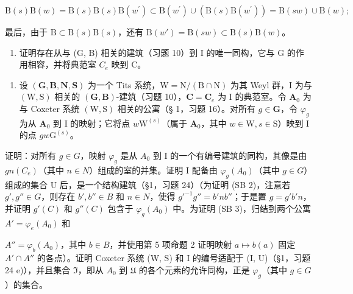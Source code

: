 \[
\mathrm{B} (s) \mathrm{B} (w) = \mathrm{B} (s) \mathrm{B} (s) \mathrm{B} \left(w ^ {\prime}\right) \subset \mathrm{B} \left(w ^ {\prime}\right) \cup \left(\mathrm{B} (s) \mathrm{B} \left(w ^ {\prime}\right)\right) = \mathrm{B} (s w) \cup \mathrm{B} (w);
\]

最后，由于 \(\mathrm{B} \subset \mathrm{B}(s)\mathrm{B}(s)\)，还有 \(\mathrm{B}(w') = \mathrm{B}(sw) \subset \mathrm{B}(s)\mathrm{B}(w)\)。

\begin{enumerate}
\def\labelenumi{\alph{enumi})}
\setcounter{enumi}{4}
\tightlist
\item
  证明存在从与 (G, B) 相关的建筑（习题 10）到 I 的唯一同构，它与 G 的作用相容，并将典范室 \(C_{e}\) 映到 C。
\end{enumerate}

\begin{enumerate}
\def\labelenumi{\arabic{enumi})}
\setcounter{enumi}{11}
\tightlist
\item
  设 \((\mathbf{G},\mathbf{B},\mathbf{N},\mathbf{S})\) 为一个 Tits 系统，\(\mathrm{W} = \mathrm{N} / (\mathrm{B}\cap \mathrm{N})\) 为其 Weyl 群，I 为与 \((\mathrm{W},\mathrm{S})\) 相关的 \((\mathbf{G},\mathbf{B})\)-建筑（习题 10），\(\mathbf{C} = \mathbf{C}_e\) 为 I 的典范室。令 \(\mathbf{A}_0\) 为与 Coxeter 系统 \((\mathrm{W},\mathrm{S})\) 相关的公寓（§ 1，习题 16）。对所有 \(g\in \mathbf{G}\)，令 \(\varphi_g\) 为从 \(\mathbf{A}_0\) 到 I 的映射；它将点 \(w\mathrm{W}^{(s)}\)（属于 \(\mathbf{A}_0\)，其中 \(w\in \mathrm{W}, s\in \mathrm{S}\)）映到 I 的点 \(gw\mathrm{G}^{(s)}\)。
\end{enumerate}

证明：对所有 \(g \in G\)，映射 \(\varphi_{g}\) 是从 \(A_{0}\) 到 I 的一个有编号建筑的同构，其像是由 \(gn(C_{e})\)（其中 \(n \in N\)）组成的室的并集。证明 I 配备由 \(\varphi_{g}(A_{0})\)（其中 \(g \in G\)）组成的集合 U 后，是一个结构建筑（§1，习题 24）（为证明 (SB 2)，注意若 \(g', g'' \in G\)，则存在 \(b', b'' \in B\) 和 \(n \in N\)，使得 \(g'^{-1}g'' = b'nb''\)；于是置 \(g = g'b'n\)，并证明 \(g'(C)\) 和 \(g''(C)\) 包含于 \(\varphi_{g}(A_{0})\) 中。为证明 (SB 3)，归结到两个公寓 \(A' = \varphi_{e}(A_{0})\) 和

\(A'' = \varphi_b(A_0)\)，其中 \(b \in B\)，并使用第 5 项命题 2 证明映射 \(a \mapsto b(a)\) 固定 \(A' \cap A''\) 的各点）。证明 Coxeter 系统 (W, S) 和 I 的编号适配于 (I, U)（§1，习题 24 e)），并且集合 \(\mathfrak{I}\)，即从 \(A_0\) 到 \(\mathfrak{U}\) 的各个元素的允许同构，正是 \(\varphi_g\)（其中 \(g \in G\)）的集合。

